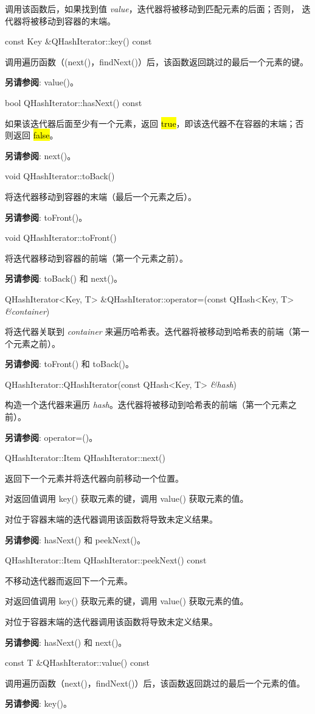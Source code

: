 调用该函数后，如果找到值 \emph{value}，迭代器将被移动到匹配元素的后面；否则，
迭代器将被移动到容器的末端。

const Key \&QHashIterator::key() const

调用遍历函数（(next()，findNext()）后，该函数返回跳过的最后一个元素的键。

\textbf{另请参阅}: value()。

bool QHashIterator::hasNext() const

如果该迭代器后面至少有一个元素，返回 \hl{true}，即该迭代器不在容器的末端；否则返回 \hl{false}。

\textbf{另请参阅}: next()。

void QHashIterator::toBack()

将迭代器移动到容器的末端（最后一个元素之后）。

\textbf{另请参阅}: toFront()。

void QHashIterator::toFront()

将迭代器移动到容器的前端（第一个元素之前）。

\textbf{另请参阅}: toBack() 和 next()。

QHashIterator<Key, T> \&QHashIterator::operator=(const QHash<Key, T> \emph{\&container})

将迭代器关联到 \emph{container} 来遍历哈希表。迭代器将被移动到哈希表的前端（第一个元素之前）。

\textbf{另请参阅}: toFront() 和 toBack()。

QHashIterator::QHashIterator(const QHash<Key, T> \emph{\&hash})

构造一个迭代器来遍历 \emph{hash}。迭代器将被移动到哈希表的前端（第一个元素之前）。

\textbf{另请参阅}: operator=()。

QHashIterator::Item QHashIterator::next()

返回下一个元素并将迭代器向前移动一个位置。

对返回值调用 key() 获取元素的键，调用 value() 获取元素的值。

对位于容器末端的迭代器调用该函数将导致未定义结果。

\textbf{另请参阅}: hasNext() 和 peekNext()。

QHashIterator::Item QHashIterator::peekNext() const

不移动迭代器而返回下一个元素。

对返回值调用 key() 获取元素的键，调用 value() 获取元素的值。

对位于容器末端的迭代器调用该函数将导致未定义结果。

\textbf{另请参阅}: hasNext() 和 next()。

const T \&QHashIterator::value() const

调用遍历函数（next()，findNext()）后，该函数返回跳过的最后一个元素的值。

\textbf{另请参阅}: key()。

